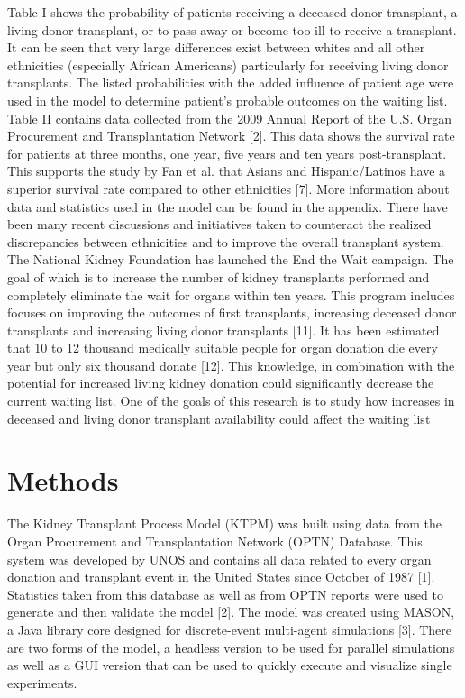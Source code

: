 \documentclass[9pt,a4paper,twocolumn]{scrartcl}
\begin{document}
Table I shows the probability of patients receiving a deceased donor transplant, a living donor transplant, or to pass away or become too ill to receive a transplant.  It can be seen that very large differences exist between whites and all other ethnicities (especially African Americans) particularly for receiving living donor transplants.  The listed probabilities with the added influence of patient age were used in the model to determine patient’s probable outcomes on the waiting list.
Table II contains data collected from the 2009 Annual Report of the U.S. Organ Procurement and Transplantation Network [2].  This data shows the survival rate for patients at three months, one year, five years and ten years post-transplant.  This supports the study by Fan et al. that Asians and Hispanic/Latinos have a superior survival rate compared to other ethnicities [7].  More information about data and statistics used in the model can be found in the appendix.
There have been many recent discussions and initiatives taken to counteract the realized discrepancies between ethnicities and to improve the overall transplant system.  The National Kidney Foundation has launched the End the Wait campaign.  The goal of which is to increase the number of kidney transplants performed and completely eliminate the wait for organs within ten years.  This program includes focuses on improving the outcomes of first transplants, increasing deceased donor transplants and increasing living donor transplants [11]. 
It has been estimated that 10 to 12 thousand medically suitable people for organ donation die every year but only six thousand donate [12].  This knowledge, in combination with the potential for increased living kidney donation could significantly decrease the current waiting list.  One of the goals of this research is to study how increases in deceased and living donor transplant availability could affect the waiting list




\section{Methods}

The Kidney Transplant Process Model (KTPM) was built using data from the Organ Procurement and Transplantation Network (OPTN) Database.  This system was developed by UNOS and contains all data related to every organ donation and transplant event in the United States since October of 1987 [1].  Statistics taken from this database as well as from OPTN reports were used to generate and then validate the model [2].  
The model was created using MASON, a Java library core designed for discrete-event multi-agent simulations [3].  There are two forms of the model, a headless version to be used for parallel simulations as well as a GUI version that can be used to quickly execute and visualize single experiments.  
\end{document}
